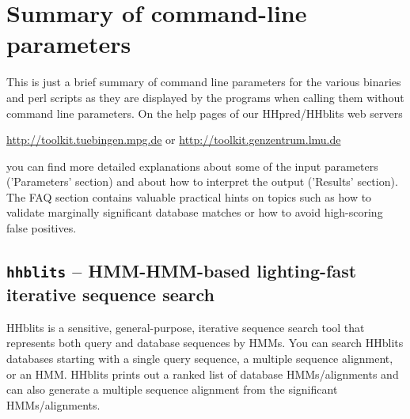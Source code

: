 \documentclass[11pt,a4paper]{article}
\begin{document}
\section{Summary of command-line parameters}

This is just a brief summary of command line parameters for the various binaries and
perl scripts as they are displayed by the programs when calling them without 
command line parameters. On the help pages of our HHpred/HHblits web servers

\url{http://toolkit.tuebingen.mpg.de} or \url{http://toolkit.genzentrum.lmu.de}

you can find more detailed explanations about some of the input parameters 
('Parameters' section) and about how to interpret the output ('Results' section). The FAQ 
section contains valuable practical hints on topics such as how to validate marginally
significant database matches or how to avoid high-scoring false positives.


\subsection{{\tt hhblits} -- HMM-HMM-based lighting-fast iterative sequence search}

HHblits is a sensitive, general-purpose, iterative sequence search tool that represents 
both query and database sequences by HMMs. You can search HHblits databases starting
with a single query sequence, a multiple sequence alignment, or an HMM. HHblits prints out
a ranked list of database HMMs/alignments and can also generate a multiple sequence alignment
from the significant HMMs/alignments.
\end{document}
